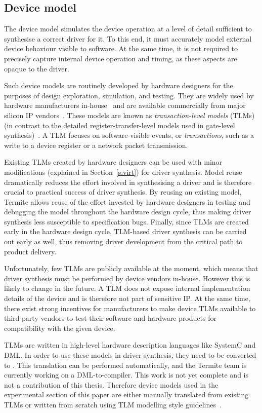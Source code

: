\subsection{Device model}
\label{sec:device_model}

The device model simulates the device operation at a level of detail sufficient to synthesise a correct driver for it.  To this end, it must accurately model external device behaviour visible to software.  At the same time, it is not required to precisely capture internal device operation and timing, as these aspects are opaque to the driver.

Such device models are routinely developed by hardware designers for the purposes of design exploration, simulation, and testing. They are widely used by hardware manufacturers in-house~\cite{cofluent} and are available commercially from major silicon IP vendors~\cite{vp}.  These models are known as \emph{transaction-level models} (TLMs) (in contrast to the detailed register-transfer-level models used in gate-level synthesis)~\cite{Cai_Gajski_03}.  A TLM focuses on software-visible events, or \emph{transactions}, such as a write to a device register or a network packet transmission.

Existing TLMs created by hardware designers can be used with minor modifications (explained in Section~\ref{s:virt}) for driver synthesis.  Model reuse dramatically reduces the effort involved in synthesising a driver and is therefore crucial to practical success of driver synthesis.  By reusing an existing model, Termite allows reuse of the effort invested by hardware designers in testing and debugging the model throughout the hardware design cycle, thus making driver synthesis less susceptible to specification bugs.  Finally, since TLMs are created early in the hardware design cycle, TLM-based driver synthesis can be carried out early as well, thus removing driver development from the critical path to product delivery.

Unfortunately, few TLMs are publicly available at the moment, which means that driver synthesis must be performed by  device vendors in-house.  However this is likely to change in the future.  A TLM does not expose internal implementation details of the device and is therefore not part of sensitive IP\@.  At the same time, there exist strong incentives for manufacturers to make device TLMs available to third-party vendors to test their software and hardware products for compatibility with the given device.

TLMs are written in high-level hardware description languages like SystemC and DML\@.  In order to use these models in driver synthesis, they need to be converted to \tsl.  This translation can be performed automatically, and the Termite team is currently working on a DML-to-\tsl compiler. This work is not yet complete and is not a contribution of this thesis. Therefore device models used in the experimental section of this paper are either manually translated from existing TLMs or written from scratch using TLM modelling style guidelines~\cite{dml_ug}.

